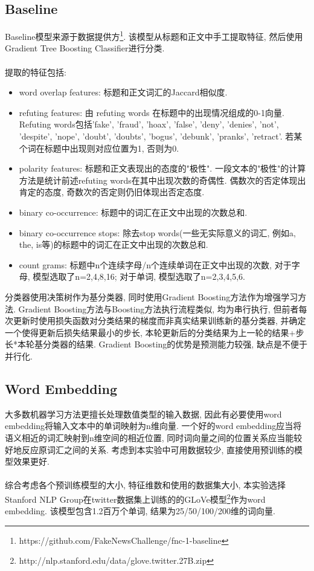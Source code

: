 \documentclass[a4paper]{article}
\begin{document}
	\subsection{Baseline}
	Baseline模型来源于数据提供方\footnote{https://github.com/FakeNewsChallenge/fnc-1-baseline}. 该模型从标题和正文中手工提取特征, 然后使用Gradient Tree Boosting Classifier进行分类.\\\\
	提取的特征包括:
	\begin{itemize}
		\item word overlap features: 标题和正文词汇的Jaccard相似度\cite{niwattanakul2013using}.
		\item refuting features: 由 refuting words 在标题中的出现情况组成的0-1向量. Refuting words包括'fake',
		'fraud',
		'hoax',
		'false',
		'deny', 'denies',
		'not',
		'despite',
		'nope',
		'doubt', 'doubts',
		'bogus',
		'debunk',
		'pranks',
		'retract'. 若某个词在标题中出现则对应位置为1, 否则为0.
		\item polarity features: 标题和正文表现出的态度的"极性". 一段文本的"极性"的计算方法是统计前述refuting words在其中出现次数的奇偶性. 偶数次的否定体现出肯定的态度, 奇数次的否定则仍旧体现出否定态度.
		\item binary co-occurrence: 标题中的词汇在正文中出现的次数总和.
		\item binary co-occurrence stops: 除去stop words(一些无实际意义的词汇, 例如a, the, is等)的标题中的词汇在正文中出现的次数总和.
		\item count grams: 标题中n个连续字母/n个连续单词在正文中出现的次数, 对于字母, 模型选取了n=2,4,8,16; 对于单词, 模型选取了n=2,3,4,5,6.
	\end{itemize}
	分类器使用决策树作为基分类器, 同时使用Gradient Boosting方法\cite{friedman2002stochastic}作为增强学习方法. Gradient Boosting方法与Boosting方法执行流程类似, 均为串行执行, 但前者每次更新时使用损失函数对分类结果的梯度而非真实结果训练新的基分类器, 并确定一个使得更新后损失结果最小的步长, 本轮更新后的分类结果为上一轮的结果+步长*本轮基分类器的结果. Gradient Boosting的优势是预测能力较强, 缺点是不便于并行化.
	\subsection{Word Embedding}
	大多数机器学习方法更擅长处理数值类型的输入数据, 因此有必要使用word embedding将输入文本中的单词映射为n维向量. 一个好的word embedding应当将语义相近的词汇映射到n维空间的相近位置, 同时词向量之间的位置关系应当能较好地反应原词汇之间的关系. 考虑到本实验中可用数据较少, 直接使用预训练的模型效果更好. \\\\
	综合考虑各个预训练模型的大小, 特征维数和使用的数据集大小, 本实验选择Stanford NLP Group在twitter数据集上训练的的GLoVe模型\footnote{http://nlp.stanford.edu/data/glove.twitter.27B.zip}作为word embedding. 该模型包含1.2百万个单词, 结果为25/50/100/200维的词向量.
\end{document}

